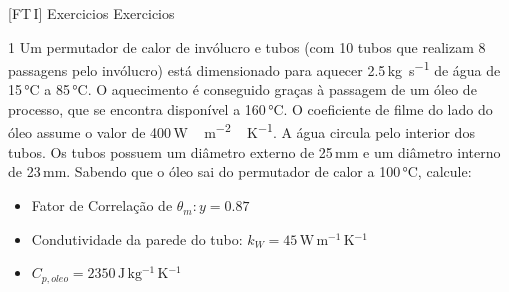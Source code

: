 \documentclass[\mainfilename]{subfiles}
\begin{document}
[FT\,I]
{Exercicios}
{Exercicios}

\setcounter{question}{2}

\begin{questionBox}1{ %
    Um permutador de calor de invólucro e tubos (com 10 tubos que realizam 8 passagens pelo invólucro) está dimensionado para aquecer 2.5\,\si{\kilo\gram\per\second} de água de 15\,\si{\celsius} a 85\,\si{\celsius}. O aquecimento é conseguido graças à passagem de um óleo de processo, que se encontra disponível a 160\,\si{\celsius}. O coeficiente de filme do lado do óleo assume o valor de 400\,\si{\watt\,\metre^{-2}\,\kelvin^{-1}}. A água circula pelo interior dos tubos. Os tubos possuem um diâmetro externo de 25\,\si{\milli\metre} e um diâmetro interno de 23\,\si{\milli\metre}. Sabendo que o óleo sai do permutador de calor a 100\,\si{\celsius}, calcule:
} %
    \vspace{-3ex}
    \begin{itemize}
        \item Fator de Correlação de \(\theta_m:y=0.87\)
        \item Condutividade da parede do tubo: \(k_W=45\,\si{\watt\,\metre^{-1}\,\kelvin^{-1}}\)
        \item \(C_{p,oleo}=2350\,\si{\joule\,\kilo\gram^{-1}\,\kelvin^{-1}}\)
    \end{itemize}

\end{questionBox}
\end{document}
